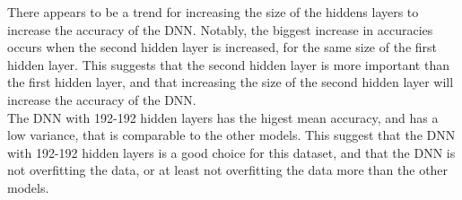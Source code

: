 \documentclass[12pt]{article}
\begin{document}
There appears to be a trend for increasing the size of the hiddens layers to increase the accuracy of the DNN. Notably, the biggest increase in accuracies occurs when the second hidden layer is increased, for the same size of the first hidden layer. This suggests that the second hidden layer is more important than the first hidden layer, and that increasing the size of the second hidden layer will increase the accuracy of the DNN.
\\
The DNN with 192-192 hidden layers has the higest mean accuracy, and has a low variance, that is comparable to the other models. This suggest that the DNN with 192-192 hidden layers is a good choice for this dataset, and that the DNN is not overfitting the data, or at least not overfitting the data more than the other models.
\end{document}
